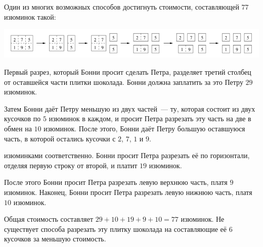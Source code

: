 Один из многих возможных способов достигнуть стоимости, составляющей $77$ изюминок такой:

\includegraphics[scale=0.5]{raisins2.png}

Первый разрез, который Бонни просит сделать Петра, разделяет третий столбец от оставшейся
части плитки шоколада. Бонни должна заплатить за это Петру $29$ изюминок.

Затем Бонни даёт Петру меньшую из двух частей~--- ту, которая состоит из двух кусочков по $5$ изюминок в каждом, и просит Петра разрезать эту часть на две в обмен на $10$ изюминок. После этого, Бонни даёт Петру большую оставшуюся часть, в которой остались кусочки с $2$, $7$, $1$ и $9$.

изюминками соответственно. Бонни просит Петра разрезать её по горизонтали, отделяя первую
строку от второй, и платит $19$ изюминок.


После этого Бонни просит Петра разрезать левую верхнюю часть, платя $9$ изюминок. Наконец,
Бонни просит Петра разрезать левую нижнюю часть, платя $10$ изюминок.

Общая стоимость составляет $29 + 10 + 19 + 9 + 10 = 77$ изюминок. Не существует способа разрезать эту плитку шоколада на составляющие её $6$ кусочков за меньшую стоимость.